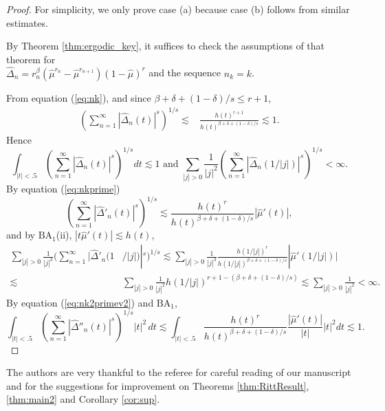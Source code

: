 \documentclass[11pt]{amsart}
\theoremstyle{definition}
\theoremstyle{remark}
\begin{document}
\begin{proof}
For simplicity, we only prove case (a) because case (b) follows from similar estimates. 

By Theorem \ref{thm:ergodic_key}, it suffices to check the assumptions of that theorem for \\ $\hat \Delta_n=r_n^{\beta}({\hat\mu}^{r_n}-{\hat\mu}^{r_{n+1}})(1-\hat\mu)^r$ and the sequence $n_k=k$.

From equation (\ref{eq:nk}),  and since $\beta+\delta+(1-\delta )/s\le r+1$,
\begin{align*}
 \left(\sum_{n=1}^{\infty} |\hat\Delta_n(t)|^s\right)^{1/s}  
 \lesssim & \frac {h(t)^{r+1}}{h(t)^{\beta+\delta +(1-\delta )/s} } \lesssim 1.
 \end{align*}
 Hence 
 \[\int_{|t|<.5} \left(\sum_{n=1}^{\infty} |\hat\Delta_n(t)|^s\right)^{1/s}  dt \lesssim 1
 \mbox{ and }
  \sum_{|j|>0} \frac 1{|j|^2} \left(\sum_{n=1}^{\infty} |\hat\Delta_n(1/|j|)|^s\right)^{1/s} <\infty.\]
 By  equation (\ref{eq:nkprime}) 
 \[
 \left(\sum_{n=1}^{\infty} |\hat\Delta'_n(t)|^s\right)^{1/s}  \lesssim \frac{h(t)^r }{h(t)^{\beta+\delta+(1-\delta)/s}} |\hat\mu'(t)|,\]
 and by $\text{BA}_1$(ii), $|t \hat\mu'(t)| \lesssim h(t)$,
\begin{align*} \sum_{|j|>0} \frac 1{|j|^3} \Big(\sum_{n=1}^{\infty}   |\hat\Delta'_n (1 &  /|j|)|^s\Big)^{1/s} 
\lesssim  \sum_{|j|>0} \frac 1{|j|^3}\frac{h(1/|j|)^r}{h(1/|j|)^{\beta+\delta+(1-\delta)/s} } |\hat\mu'(1/|j|)|\\
\lesssim & \sum_{|j|>0} \frac 1{|j|^2}h(1/|j|)^{r+1-(\beta+\delta+(1-\delta)/s)}
\lesssim  \sum_{|j|>0} \frac 1{|j|^2}<\infty.
\end{align*}
 By equation (\ref{eq:nk2primev2}) and $\text{BA}_1$,
\[ \int_{|t|<.5} \left(\sum_{n=1}^{\infty} |\hat\Delta''_n(t)|^s\right)^{1/s}  |t|^2 \, dt 
 \lesssim \int_{|t|<.5}  \frac{h(t)^r}{h(t)^{\beta+\delta+(1-\delta)/s} }\frac{|\hat\mu'(t)|}{|t|} |t|^2 dt 
 \lesssim 1.\]
\end{proof} 
















The authors are very thankful to the referee for careful reading of our manuscript and for the suggestions for improvement on 
Theorems \ref{thm:RittResult}, %
\ref{thm:main2} %
and Corollary \ref{cor:sup}. %
\end{document}
